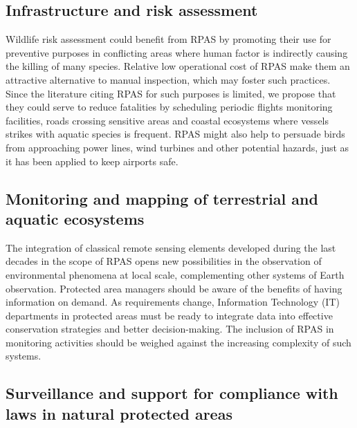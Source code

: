 \documentclass[]{interact}
\theoremstyle{plain}%
\theoremstyle{definition}
\theoremstyle{remark}
\begin{document}
\subsection{Infrastructure and risk
assessment}\label{infrastructure-and-risk-assessment-1}

Wildlife risk assessment could benefit from RPAS by promoting their use
for preventive purposes in conflicting areas where human factor is
indirectly causing the killing of many species. Relative low operational
cost of RPAS make them an attractive alternative to manual inspection,
which may foster such practices. Since the literature citing RPAS for
such purposes is limited, we propose that they could serve to reduce
fatalities by scheduling periodic flights monitoring facilities, roads
crossing sensitive areas and coastal ecosystems where vessels strikes
with aquatic species is frequent. RPAS might also help to persuade birds
from approaching power lines, wind turbines and other potential hazards,
just as it has been applied to keep airports safe.

\subsection{Monitoring and mapping of terrestrial and aquatic
ecosystems}\label{monitoring-and-mapping-of-terrestrial-and-aquatic-ecosystems-1}

The integration of classical remote sensing elements developed during
the last decades in the scope of RPAS opens new possibilities in the
observation of environmental phenomena at local scale, complementing
other systems of Earth observation. Protected area managers should be
aware of the benefits of having information on demand. As requirements
change, Information Technology (IT) departments in protected areas must
be ready to integrate data into effective conservation strategies and
better decision-making. The inclusion of RPAS in monitoring activities
should be weighed against the increasing complexity of such systems.

\subsection{Surveillance and support for compliance with laws in natural
protected
areas}\label{surveillance-and-support-for-compliance-with-laws-in-natural-protected-areas}
\end{document}
